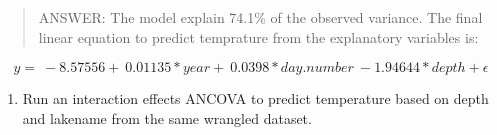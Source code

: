 \documentclass[]{article}
\newenvironment{Shaded}{\begin{snugshade}}{\end{snugshade}}
\newcommand{\KeywordTok}[1]{\textcolor[rgb]{0.13,0.29,0.53}{\textbf{#1}}}
\newcommand{\DataTypeTok}[1]{\textcolor[rgb]{0.13,0.29,0.53}{#1}}
\newcommand{\StringTok}[1]{\textcolor[rgb]{0.31,0.60,0.02}{#1}}
\newcommand{\CommentTok}[1]{\textcolor[rgb]{0.56,0.35,0.01}{\textit{#1}}}
\newcommand{\OperatorTok}[1]{\textcolor[rgb]{0.81,0.36,0.00}{\textbf{#1}}}
\newcommand{\NormalTok}[1]{#1}
\providecommand{\tightlist}{%
  \setlength{\itemsep}{0pt}\setlength{\parskip}{0pt}}
\begin{document}
\begin{quote}
ANSWER: The model explain 74.1\% of the observed variance. The final
linear equation to predict temprature from the explanatory variables is:
\end{quote}

\[ y = \ -8.57556 + \ 0.01135*year + \ 0.0398*day.number  \ -1.94644*depth + \epsilon \]

\begin{enumerate}
\def\labelenumi{\arabic{enumi}.}
\setcounter{enumi}{13}
\tightlist
\item
  Run an interaction effects ANCOVA to predict temperature based on
  depth and lakename from the same wrangled dataset.
\end{enumerate}

\begin{Shaded}
\end{Shaded}
\end{document}
